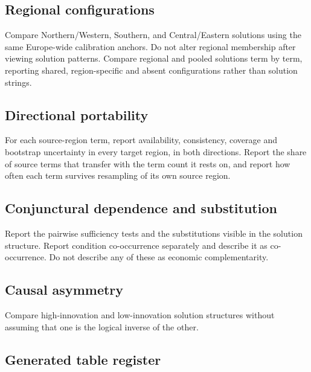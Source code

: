 \subsection{Regional configurations}

Compare Northern/Western, Southern, and Central/Eastern solutions using the same
Europe-wide calibration anchors. Do not alter regional membership after viewing
solution patterns. Compare regional and pooled solutions term by term, reporting
shared, region-specific and absent configurations rather than solution strings.

\subsection{Directional portability}

For each source-region term, report availability, consistency, coverage and
bootstrap uncertainty in every target region, in both directions. Report the
share of source terms that transfer with the term count it rests on, and report
how often each term survives resampling of its own source region.

\subsection{Conjunctural dependence and substitution}

Report the pairwise sufficiency tests and the substitutions visible in the
solution structure. Report condition co-occurrence separately and describe it as
co-occurrence. Do not describe any of these as economic complementarity.

\subsection{Causal asymmetry}

Compare high-innovation and low-innovation solution structures without assuming
that one is the logical inverse of the other.

\subsection{Generated table register}

